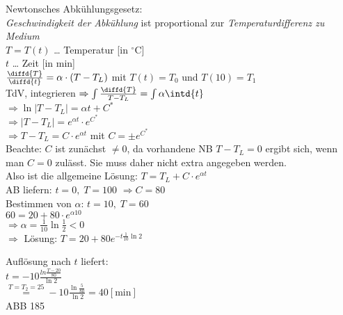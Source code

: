 \begin{anumerate}
\item Newtonsches Abkühlungsgesetz:\\
\emph{Geschwindigkeit der Abkühlung} ist proportional zur \emph{Temperaturdifferenz zu Medium}\\
$T=T(t)$ … Temperatur [in $^\circ \mathrm{C}$]\\
$t$ … Zeit [in min]\\
$\frac{\diffd{T}}{\diffd{t}}=\alpha\cdot (T-T_L)$ mit $T(t)=T_0$ und $T(10)=T_1$\\
TdV, integrieren $\Rightarrow  \int \frac{\diffd{T}}{T-T_L}= \int\alpha \intd{t}$\\
$\Rightarrow \ln|T-T_L| = \alpha t + C^*$\\
$\Rightarrow |T-T_L| = e^{\alpha t}\cdot e^{C^*}$\\
$\Rightarrow T-T_L = C \cdot e^{\alpha t}$ mit $C=\pm e^{C^*}$\\
Beachte: $C$ ist zunächst $\not = 0$, da vorhandene NB $T-T_L=0$ ergibt sich, wenn man $C=0$ zulässt. Sie muss daher nicht extra angegeben werden.\\
Also ist die allgemeine Lösung: $T=T_L+C\cdot e^{\alpha t}$\\
AB liefern: $t=0, \; T=100$ $\Rightarrow C=80$\\
Bestimmen von $\alpha$: $t=10, \; T=60$\\
$60=20+80\cdot e^{\alpha 10}$\\
$\Rightarrow \alpha = \frac{1}{10}\ln\frac{1}{2}<0$\\
$\Rightarrow$ Lösung: $T=20+80e^{-t\frac{1}{10}\ln 2}$
\item Auflösung nach $t$ liefert:\\
$t=-10\frac{ln\frac{T-20}{80}}{\ln 2}$\\
$\overset{T=T_2=25}{=}-10\frac{\ln\frac{5}{80}}{\ln 2}=40 [\mathrm{min}]$\\
ABB 185
\end{anumerate}

